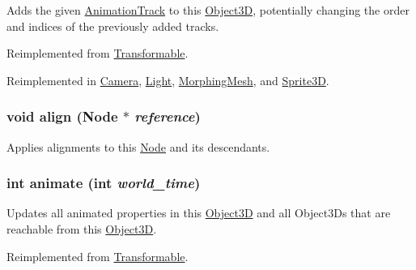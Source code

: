 Adds the given \hyperlink{classm3g_1_1AnimationTrack}{AnimationTrack} to this \hyperlink{classm3g_1_1Object3D}{Object3D}, potentially changing the order and indices of the previously added tracks. 

Reimplemented from \hyperlink{classm3g_1_1Transformable_415c0b110f95410ded9b85e5d99a496b}{Transformable}.

Reimplemented in \hyperlink{classm3g_1_1Camera_415c0b110f95410ded9b85e5d99a496b}{Camera}, \hyperlink{classm3g_1_1Light_415c0b110f95410ded9b85e5d99a496b}{Light}, \hyperlink{classm3g_1_1MorphingMesh_415c0b110f95410ded9b85e5d99a496b}{MorphingMesh}, and \hyperlink{classm3g_1_1Sprite3D_415c0b110f95410ded9b85e5d99a496b}{Sprite3D}.\hypertarget{classm3g_1_1Node_3db1b4be060fe3d4f3dbf9720ef85234}{
\subsubsection[{align}]{\setlength{\rightskip}{0pt plus 5cm}void align ({\bf Node} $\ast$ {\em reference})}}
\label{classm3g_1_1Node_3db1b4be060fe3d4f3dbf9720ef85234}


Applies alignments to this \hyperlink{classm3g_1_1Node}{Node} and its descendants. \hypertarget{classm3g_1_1Node_8aad1ceab4c2a03609c8a42324ce484d}{
\subsubsection[{animate}]{\setlength{\rightskip}{0pt plus 5cm}int animate (int {\em world\_\-time})}}
\label{classm3g_1_1Node_8aad1ceab4c2a03609c8a42324ce484d}


Updates all animated properties in this \hyperlink{classm3g_1_1Object3D}{Object3D} and all Object3Ds that are reachable from this \hyperlink{classm3g_1_1Object3D}{Object3D}. 

Reimplemented from \hyperlink{classm3g_1_1Transformable_8aad1ceab4c2a03609c8a42324ce484d}{Transformable}.

